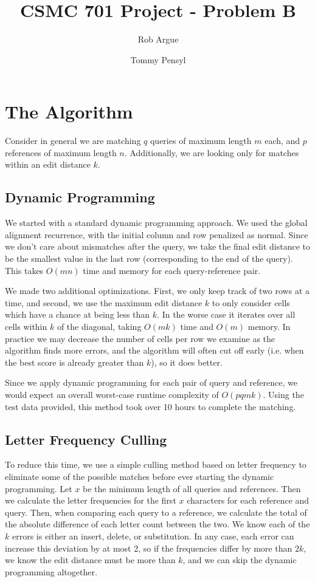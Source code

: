\documentclass[11pt,letterpaper]{article}
\begin{document}
\title{CSMC 701 Project - Problem B}
\author{Rob Argue \and Tommy Pensyl}
\maketitle
\section{The Algorithm}
Consider in general we are matching $q$ queries of maximum length $m$ each, and $p$ references of maximum length $n$. Additionally, we are looking only for matches within an edit distance $k$.

\subsection{Dynamic Programming}
We started with a standard dynamic programming approach. We used the global alignment recurrence, with the initial column and row penalized as normal. Since we don't care about mismatches after the query, we take the final edit distance to be the smallest value in the last row (corresponding to the end of the query). This takes $O(mn)$ time and memory for each query-reference pair. 

We made two additional optimizations. First, we only keep track of two rows at a time, and second, we use the maximum edit distance $k$ to only consider cells which have a chance at being less than $k$. In the worse case it iterates over all cells within $k$ of the diagonal, taking $O(mk)$ time and $O(m)$ memory. In practice we may decrease the number of cells per row we examine as the algorithm finds more errors, and the algorithm will often cut off early (i.e. when the best score is already greater than $k$), so it does better.

Since we apply dynamic programming for each pair of query and reference, we would expect an overall worst-case runtime complexity of $O(pqmk)$. Using the test data provided, this method took over 10 hours to complete the matching.

\subsection{Letter Frequency Culling}
To reduce this time, we use a simple culling method based on letter frequency to eliminate some of the possible matches before ever starting the dynamic programming. Let $x$ be the minimum length of all queries and references. Then we calculate the letter frequencies for the first $x$ characters for each reference and query. Then, when comparing each query to a reference, we calculate the total of the absolute difference of each letter count between the two. We know each of the $k$ errors is either an insert, delete, or substitution. In any case, each error can increase this deviation by at most 2, so if the frequencies differ by more than $2k$, we know the edit distance must be more than $k$, and we can skip the dynamic programming altogether.
\end{document}
